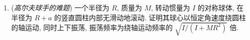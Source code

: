 \begin{RiemannExercise}
\begin{enumerate}[label=(\arabic*),ref=\arabic*,leftmargin=*]
\begin{enumerate}[label=(\alph*),leftmargin=*]
\item 既然将 $TSO(3)$ 的纤维与 $\mathbb{R}^3$ 等同, 也可以利用 Euclidean 内积将 $T^*SO(3)$ 的纤维与 $\mathbb{R}^3$ 等同. 证明在此等同下, 给出无滑动滚动条件的非完整约束是由下列 1-形式的核确定的分布:
\[
  \theta^x:=\mathrm{d}x-Re_y,\qquad\theta^y:=\mathrm{d}y+Re_x
\]
(其中 $\{e_x,e_y,e_z\}$ 是 $\mathbb{R}^3$ 的标准基). 该分布可积吗? (\textbf{提示}: 证明 $\mathbb{R}^2\times SO(3)$ 中的任意两点可由与该分布相容的分段光滑曲线连接.)
\item 证明球体沿直线以恒定速率运动, 其角速度恒定且垂直于运动方向.
\item 确定球体在斜面上, 即受势能 $U=Mg\sin\alpha\,x$ 作用时的运动.
\end{enumerate}
\item\label{ex:golfer-dilemma}
(\emph{高尔夫球手的难题}) 一个半径为 $R$, 质量为 $M$, 转动惯量为 $I$ 的对称球体, 在半径为 $R+a$ 的竖直圆柱内部无滑动地滚动. 证明其球心以恒定角速度绕圆柱的轴运动, 同时上下振荡, 振荡频率为绕轴运动频率的 $\sqrt{I/(I+MR^2)}$ 倍.
\end{enumerate}
\end{RiemannExercise}
